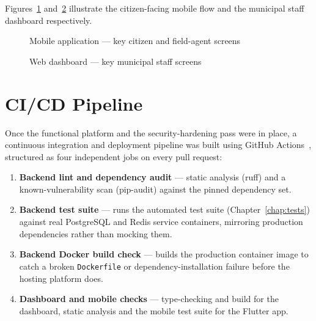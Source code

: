 Figures~\ref{fig:ui-mobile} and~\ref{fig:ui-dashboard} illustrate the citizen-facing mobile flow and the municipal staff dashboard respectively.

\begin{figure}[h!]
\centering
{}
\caption{Mobile application --- key citizen and field-agent screens}
\label{fig:ui-mobile}
\end{figure}

\begin{figure}[h!]
\centering
{}
\caption{Web dashboard --- key municipal staff screens}
\label{fig:ui-dashboard}
\end{figure}

\section{CI/CD Pipeline}
\label{sec:cicd}

Once the functional platform and the security-hardening pass were in place, a continuous integration and deployment pipeline was built using GitHub Actions~\cite{gha}, structured as four independent jobs on every pull request:

\begin{enumerate}[leftmargin=*]
  \item \textbf{Backend lint and dependency audit} --- static analysis (ruff) and a known-vulnerability scan (pip-audit) against the pinned dependency set.
  \item \textbf{Backend test suite} --- runs the automated test suite (Chapter~\ref{chap:tests}) against real PostgreSQL and Redis service containers, mirroring production dependencies rather than mocking them.
  \item \textbf{Backend Docker build check} --- builds the production container image to catch a broken \texttt{Dockerfile} or dependency-installation failure before the hosting platform does.
  \item \textbf{Dashboard and mobile checks} --- type-checking and build for the dashboard, static analysis and the mobile test suite for the Flutter app.
\end{enumerate}

